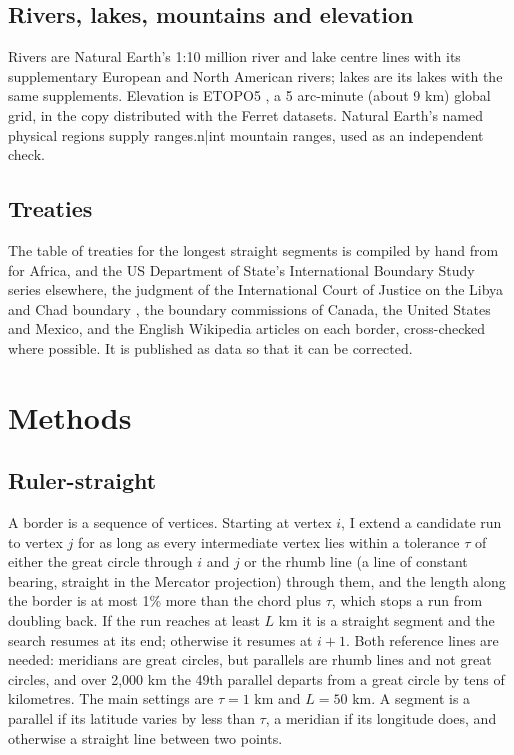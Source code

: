 \documentclass[11pt,a4paper]{article}
\begin{document}
\subsection{Rivers, lakes, mountains and elevation}
Rivers are Natural Earth's 1:10 million river and lake centre lines with its supplementary European and North American rivers; lakes are its lakes with the same supplements. Elevation is ETOPO5 \citep{etopo5}, a 5 arc-minute (about 9 km) global grid, in the copy distributed with the Ferret datasets. Natural Earth's named physical regions supply {{ranges.n|int}} mountain ranges, used as an independent check.

\subsection{Treaties}
The table of treaties for the longest straight segments is compiled by hand from \citet{brownlie1979} for Africa, \citet{biger1995} and the US Department of State's International Boundary Study series elsewhere, the judgment of the International Court of Justice on the Libya and Chad boundary \citep{icj1994}, the boundary commissions of Canada, the United States and Mexico, and the English Wikipedia articles on each border, cross-checked where possible. It is published as data so that it can be corrected.

\section{Methods}
\subsection{Ruler-straight}
A border is a sequence of vertices. Starting at vertex $i$, I extend a candidate run to vertex $j$ for as long as every intermediate vertex lies within a tolerance $\tau$ of either the great circle through $i$ and $j$ or the rhumb line (a line of constant bearing, straight in the Mercator projection) through them, and the length along the border is at most 1\% more than the chord plus $\tau$, which stops a run from doubling back. If the run reaches at least $L$ km it is a straight segment and the search resumes at its end; otherwise it resumes at $i+1$. Both reference lines are needed: meridians are great circles, but parallels are rhumb lines and not great circles, and over 2,000 km the 49th parallel departs from a great circle by tens of kilometres. The main settings are $\tau = 1$ km and $L = 50$ km. A segment is a parallel if its latitude varies by less than $\tau$, a meridian if its longitude does, and otherwise a straight line between two points.
\end{document}
